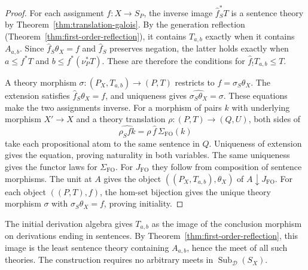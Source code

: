 \begin{proof}
For each assignment $f:X\to S_P$, the inverse image $\widehat f_S^*T$
is a sentence theory by Theorem~\ref{thm:translation-galois}.
By the generation reflection (Theorem~\ref{thm:first-order-reflection}),
it contains $T_{a,b}$ exactly when it contains $A_{a,b}$.
Since $\widehat f_S\theta_X=f$ and $\widehat f_S$ preserves negation,
the latter holds exactly when $a\leq f^*T$ and $b\leq f^*(\nu_P^*T)$.
These are therefore the conditions for $\widehat f_!T_{a,b}\leq T$.

A theory morphism $\sigma:(P_X,T_{a,b})\to(P,T)$ restricts to
$f=\sigma_S\theta_X$. The extension satisfies $\widehat f_S\theta_X=f$,
and uniqueness gives
$\widehat{\sigma_S\theta_X}=\sigma$. These equations make the two
assignments inverse. For a morphism of pairs $k$ with underlying
morphism $X'\to X$ and a theory translation $\rho:(P,T)\to(Q,U)$,
both sides of
\[
 \widehat{\rho_S f k}=\rho\,\widehat f\,\Sigma_{\mathrm{FO}}(k)
\]
take each propositional atom to the same sentence in $Q$.
Uniqueness of extension gives the equation, proving naturality in both
variables. The same uniqueness gives the functor laws for
$\Sigma_{\mathrm{FO}}$. For $J_{\mathrm{FO}}$ they follow from
composition of sentence morphisms.
The unit at $A$ gives the object $((P_X,T_{a,b}),\theta_X)$ of
$A\downarrow J_{\mathrm{FO}}$. For each object $((P,T),f)$, the
hom-set bijection gives the unique theory morphism $\sigma$ with
$\sigma_S\theta_X=f$, proving initiality.
\end{proof}

The initial derivation algebra gives $T_{a,b}$ as the image of the
conclusion morphism on derivations ending in sentences.
By Theorem~\ref{thm:first-order-reflection}, this image is the least
sentence theory containing $A_{a,b}$, hence the meet of all such theories.
The construction requires no arbitrary meets in
$\operatorname{Sub}_{\mathcal D}(S_X)$.

